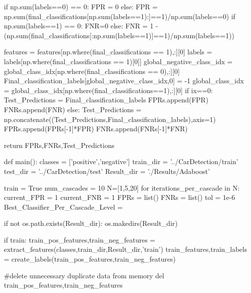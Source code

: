 \documentclass{article}
\begin{document}
\begin{python}
		if np.sum(labels==0) == 0:
			FPR = 0
		else:
			FPR = np.sum(final_classifications[np.sum(labels==1):]==1)/np.sum(labels==0)
		if np.sum(labels==1) == 0:
			FNR=0
		else:
			FNR = 1 - (np.sum(final_classifications[:np.sum(labels==1)]==1)/np.sum(labels==1))


		features = features[np.where(final_classifications == 1),:][0]
		labels = labels[np.where(final_classifications == 1)[0]]
		global_negative_class_idx = global_class_idx[np.where(final_classifications == 0),:][0]
		Final_classification_labels[global_negative_class_idx,0] = -1
		global_class_idx = global_class_idx[np.where(final_classifications==1),:][0]
		if ix==0:
			Test_Predictions = Final_classification_labels
			FPRs.append(FPR)
			FNRs.append(FNR)
		else:
			Test_Predictions = np.concatenate((Test_Predictions,Final_classification_labels),axis=1)
			FPRs.append(FPRs[-1]*FPR)
			FNRs.append(FNRs[-1]*FNR)

	return FPRs,FNRs,Test_Predictions

def main():
	classes = ['positive','negative']
	train_dir = '../CarDetection/train'
	test_dir = '../CarDetection/test'
	Result_dir = './Results/Adaboost'

	train = True
	num_cascades = 10
	N=[1,5,20]
	for iterations_per_cascade in N:
		current_FPR = 1
		current_FNR = 1
		FPRs = list()
		FNRs = list()
		tol = 1e-6
		Best_Classifier_Per_Cascade_Level = {}

		if not os.path.exists(Result_dir):
			os.makedirs(Result_dir)

		if train:
			train_pos_features,train_neg_features = extract_features(classes,train_dir,Result_dir,'train')
			train_features,train_labels = create_labels(train_pos_features,train_neg_features)

			#delete unnecessary duplicate data from memory
			del train_pos_features,train_neg_features


\end{python}
\end{document}

